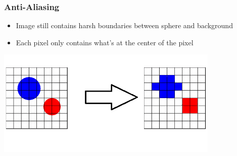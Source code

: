 \documentclass{beamer}
\begin{document}
\begin{frame}[fragile]
	\frametitle{Anti-Aliasing}
	\begin{itemize}
		\item Image still contains harsh boundaries between sphere and background
		\item Each pixel only contains what's at the center of the pixel
	\end{itemize}
	\begin{center}
		\includegraphics[width=0.8\textwidth]{media/aliasExample.png}
	\end{center}
	
\end{frame}
\end{document}
